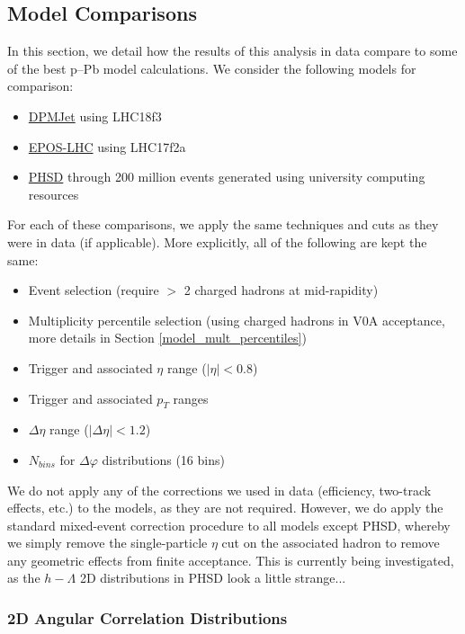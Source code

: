 \subsection{Model Comparisons}
\label{model_comparisons}
In this section, we detail how the results of this analysis in data compare to some of the best p--Pb model calculations. We consider the following models for comparison:
\begin{itemize}
\item \href{https://arxiv.org/pdf/hep-ph/0012252.pdf}{DPMJet} using LHC18f3
\item \href{https://arxiv.org/pdf/1306.0121.pdf}{EPOS-LHC} using LHC17f2a
\item \href{https://arxiv.org/pdf/0808.0022.pdf}{PHSD} through 200 million events generated using university computing resources
\end{itemize}

For each of these comparisons, we apply the same techniques and cuts as they were in data (if applicable). More explicitly, all of the following are kept the same:
\begin{itemize}
\item Event selection (require $>$ 2 charged hadrons at mid-rapidity)
\item Multiplicity percentile selection (using charged hadrons in V0A acceptance, more details in Section \ref{model_mult_percentiles})
\item Trigger and associated $\eta$ range ($|\eta| < 0.8$)
\item Trigger and associated $p_{T}$ ranges
\item $\Delta\eta$ range ($|\Delta\eta| < 1.2$)
\item $N_{bins}$ for $\Delta\varphi$ distributions (16 bins)
\end{itemize}

We do not apply any of the corrections we used in data (efficiency, two-track effects, etc.) to the models, as they are not required. However, we do apply the standard mixed-event correction procedure to all models except PHSD, whereby we simply remove the single-particle $\eta$ cut on the associated hadron to remove any geometric effects from finite acceptance. This is currently being investigated, as the $h-\Lambda$ 2D distributions in PHSD look a little strange...

\subsubsection{2D Angular Correlation Distributions}
\label{model_2d_correlations}

